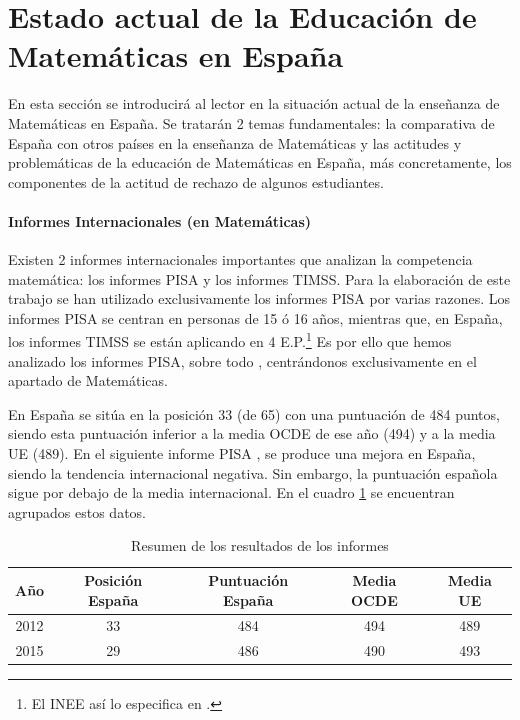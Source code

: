 

\label{chap:intro} %


\section{Estado actual de la Educación de Matemáticas en España}
\label{sec:EstadoEducacionMates}

En esta sección se introducirá al lector en la situación actual de la enseñanza de Matemáticas en España. 
%
Se tratarán 2 temas fundamentales: la comparativa de España con otros países en la enseñanza de Matemáticas y las actitudes y problemáticas de la educación de Matemáticas en España, más concretamente, los componentes de la actitud de rechazo de algunos estudiantes.


\paragraph{Informes Internacionales (en Matemáticas)} 

Existen 2 informes internacionales importantes que analizan la competencia matemática: los informes \gls{PISA} y los informes \gls{TIMSS}. 
%
Para la elaboración de este trabajo se han utilizado exclusivamente los informes \gls{PISA} por varias razones. 
%
Los informes \gls{PISA} se centran en personas de 15 ó 16 años, mientras que, en España, los informes \gls{TIMSS} se están aplicando en 4 E.P.\footnote{El \gls{INEE} así lo especifica en \cite{InformeTimss}.} 
%
Es por ello que hemos analizado los informes \gls{PISA}, sobre todo , centrándonos exclusivamente en el apartado de Matemáticas.

En  España se sitúa en la posición 33 (de 65) con una puntuación de 484 puntos, siendo esta puntuación inferior a la media OCDE de ese año (494) y a la media UE (489).
%
En el siguiente informe PISA , se produce una mejora en España, siendo la tendencia internacional negativa. 
%
Sin embargo, la puntuación española sigue por debajo de la media internacional.
%
En el cuadro \ref{tbl::ResumenPisa} se encuentran agrupados estos datos.

\begin{table}[hbtp]
\centering
\caption{Resumen de los resultados de los informes }
\label{tbl::ResumenPisa}
\begin{tabular}{c|cccc}
Año & Posición España & Puntuación España & Media OCDE & Media UE\\\hline
2012 & 33 & 484 & 494 & 489\\
2015 & 29 & 486 & 490 & 493
\end{tabular}
\end{table}

